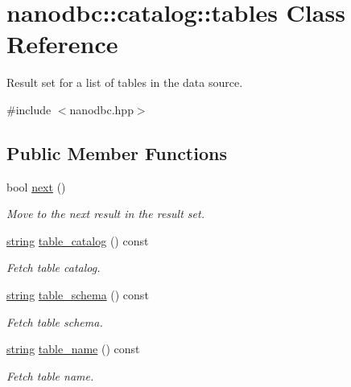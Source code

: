 \hypertarget{classnanodbc_1_1catalog_1_1tables}{}\section{nanodbc\+::catalog\+::tables Class Reference}
\label{classnanodbc_1_1catalog_1_1tables}


Result set for a list of tables in the data source.  




{\ttfamily \#include $<$nanodbc.\+hpp$>$}

\subsection*{Public Member Functions}
\begin{DoxyCompactItemize}
\item 
bool \mbox{\hyperlink{classnanodbc_1_1catalog_1_1tables_a5315f75223a7ce90b4fcff38e03ee355}{next}} ()
\begin{DoxyCompactList}\small\item\em Move to the next result in the result set. \end{DoxyCompactList}\item 
\mbox{\hyperlink{namespacenanodbc_abfc0ece56278e590911ec8352774c212}{string}} \mbox{\hyperlink{classnanodbc_1_1catalog_1_1tables_a1322c3bbfbd4500aef0c7655d172b5b0}{table\+\_\+catalog}} () const
\begin{DoxyCompactList}\small\item\em Fetch table catalog. \end{DoxyCompactList}\item 
\mbox{\hyperlink{namespacenanodbc_abfc0ece56278e590911ec8352774c212}{string}} \mbox{\hyperlink{classnanodbc_1_1catalog_1_1tables_af38adabf52d3dc10178704c5f5a551d3}{table\+\_\+schema}} () const
\begin{DoxyCompactList}\small\item\em Fetch table schema. \end{DoxyCompactList}\item 
\mbox{\hyperlink{namespacenanodbc_abfc0ece56278e590911ec8352774c212}{string}} \mbox{\hyperlink{classnanodbc_1_1catalog_1_1tables_a10115337bee64ff69a3808f12819f8a1}{table\+\_\+name}} () const
\begin{DoxyCompactList}\small\item\em Fetch table name. \end{DoxyCompactList}\item 

\end{DoxyCompactItemize}
